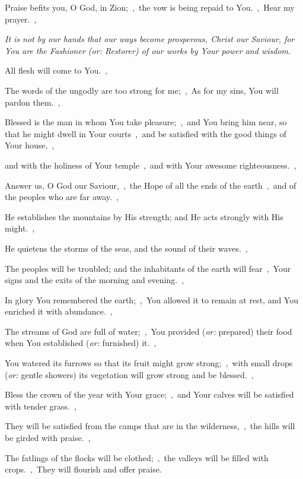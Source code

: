 \documentclass[12pt,twoside,a5paper]{article}
\newcommand{\qanona}[1]{{\liturgicalhint{Qanona.} \emph{#1}}}
\newcommand{\translationoption}[1]{\emph{or:} #1}
\begin{document}
\begin{normalparskip}
  Praise befits you, O God, in Zion;~\sep\ the vow is being repaid to You.~\sep\ Hear my prayer.~\sep

  \qanona{It is not by our hands that our ways become prosperous, Christ our Saviour, for You are the Fashioner (\translationoption{Restorer}) of our works by Your power and wisdom.}

  All flesh will come to You.~\sep

  The words of the ungodly are too strong for me;~\sep\ As for my sins, You will pardon them.~\sep

  Blessed is the man in whom You take pleasure;~\sep\ and You bring him near, so that he might dwell in Your courts~\sep\ and be satisfied with the good things of Your house,~\sep

  and with the holiness of Your temple~\sep\ and with Your awesome righteousness.~\sep

  Answer us, O God our Saviour,~\sep\ the Hope of all the ends of the earth~\sep\ and of the peoples who are far away.~\sep

  He establishes the mountains by His strength; and He acts strongly with His might.~\sep

  He quietens the storms of the seas, and the sound of their waves.~\sep

  The peoples will be troubled; and the inhabitants of the earth will fear~\sep\ Your signs and the exits of the morning and evening.~\sep

  In glory You remembered the earth;~\sep\ You allowed it to remain at rest, and You enriched it with abundance.~\sep

  The streams of God are full of water;~\sep\ You provided (\translationoption{prepared}) their food when You established (\translationoption{furnished}) it.~\sep

  You watered its furrows so that its fruit might grow strong;~\sep\ with small drops (\translationoption{gentle showers}) its vegetation will grow strong and be blessed.~\sep

  Bless the crown of the year with Your grace;~\sep\ and Your calves will be satisfied with tender grass.~\sep

  They will be satisfied from the camps that are in the wilderness,~\sep\ the hills will be girded with praise.~\sep

  The fatlings of the flocks will be clothed;~\sep\ the valleys will be filled with crops.~\sep\ They will flourish and offer praise.
\end{normalparskip}
\end{document}
